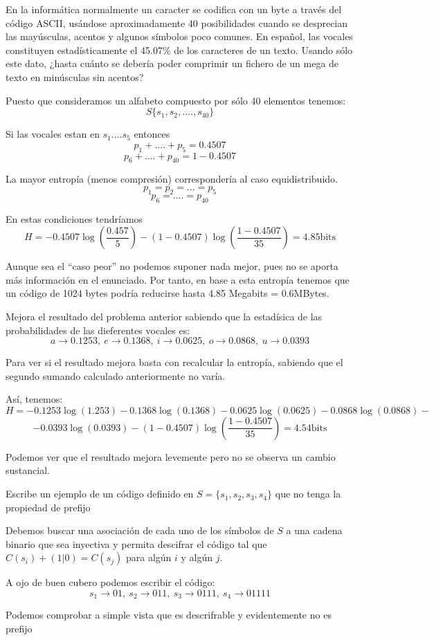 \begin{problem}[6]
En la informática normalmente un caracter se codifica con un byte a través del código ASCII, usándose aproximadamente 40 posibilidades cuando se desprecian las mayúsculas, acentos y algunos símbolos poco comunes. En español, las vocales constituyen estadísticamente el 45.07\% de los caracteres de un texto. Usando sólo este dato, ¿hasta cuánto se debería poder comprimir un fichero de un mega de texto en minúsculas sin acentos?
\solution

Puesto que consideramos un alfabeto compuesto por sólo 40 elementos tenemos:
$$S \{ s_1, s_2 , ...., s_{40}\}$$

Si las vocales estan en $s_1....s_5$ entonces
$$p_1+....+p_5 = 0.4507$$
$$p_6 +....+ p_{40} = 1 - 0.4507$$

La mayor entropía (menos compresión) correspondería al caso equidistribuido.
$$p_1= p_2=...=p_5$$
$$p_6=....=p_{40}$$

En estas condiciones tendríamos
\[H= -0.4507\log\left(\frac{0.457}{5}\right)-(1-0.4507)\log\left( \frac{1-0.4507}{35}\right) = 4.85 \text{bits}\]

Aunque sea el ``caso peor'' no podemos suponer nada mejor, pues no se aporta más información en el enunciado. Por tanto, en base a esta entropía tenemos que un código de 1024 bytes podría reducirse hasta 4.85 Megabits = 0.6MBytes.
\end{problem}

\begin{problem}[7]
Mejora el resultado del problema anterior sabiendo que la estadísica de las probabilidades de las dieferentes vocales es:
\[a \to 0.1253, \ e \to 0.1368, \ i \to 0.0625, \ o \to 0.0868, \ u \to 0.0393\]
\solution

\yoP

Para ver si el resultado mejora basta con recalcular la entropía, sabiendo que el segundo sumando calculado anteriormente no varía.

Así, tenemos:
\[H= -0.1253\log(1.253)-0.1368\log(0.1368)-0.0625\log(0.0625)-0.0868\log(0.0868)-\]
\[-0.0393\log(0.0393)-(1-0.4507)\log\left( \frac{1-0.4507}{35}\right)=4.54 \text{bits}\]

Podemos ver que el resultado mejora levemente pero no se observa un cambio sustancial.

\end{problem}

\begin{problem}[8]
Escribe un ejemplo de un código definido en $S=\{s_1,s_2,s_3,s_4\}$ que no tenga la propiedad de prefijo
\solution

Debemos buscar una asociación de cada uno de los símbolos de $S$ a una cadena binario que sea inyectiva y permita descifrar el código tal que $C(s_i)+(1|0)=C(s_j)$ para algún $i$ y algún $j$.

A ojo de buen cubero podemos escribir el código:
\[s_1\to 01, \ s_2 \to 011, \ s_3 \to 0111, \ s_4 \to 01111\]

Podemos comprobar a simple vista que es descrifrable y evidentemente no es prefijo

\end{problem}

